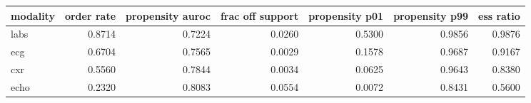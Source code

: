 \begin{tabular}{lrrrrrr}
\toprule
\textbf{modality} & \textbf{order rate} & \textbf{propensity auroc} & \textbf{frac off support} & \textbf{propensity p01} & \textbf{propensity p99} & \textbf{ess ratio} \\
\midrule
labs & 0.8714 & 0.7224 & 0.0260 & 0.5300 & 0.9856 & 0.9876 \\
ecg & 0.6704 & 0.7565 & 0.0029 & 0.1578 & 0.9687 & 0.9167 \\
cxr & 0.5560 & 0.7844 & 0.0034 & 0.0625 & 0.9643 & 0.8380 \\
echo & 0.2320 & 0.8083 & 0.0554 & 0.0072 & 0.8431 & 0.5600 \\
\bottomrule
\end{tabular}
